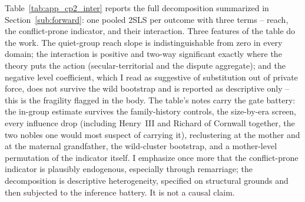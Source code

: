 \documentclass[12pt]{article}
\theoremstyle{definition}
\theoremstyle{remark}
\begin{document}
Table~\ref{tab:app_cp2_inter} reports the full decomposition summarized in Section~\ref{sub:forward}: one pooled 2SLS per outcome with three terms -- reach, the conflict-prone indicator, and their interaction. Three features of the table do the work. The quiet-group reach slope is indistinguishable from zero in every domain; the interaction is positive and two-way significant exactly where the theory puts the action (secular-territorial and the dispute aggregate); and the negative level coefficient, which I read as suggestive of substitution out of private force, does not survive the wild bootstrap and is reported as descriptive only -- this is the fragility flagged in the body. The table's notes carry the gate battery: the in-group estimate survives the family-history controls, the size-by-era screen, every influence drop (including Henry~III and Richard of Cornwall together, the two nobles one would most suspect of carrying it), reclustering at the mother and at the maternal grandfather, the wild-cluster bootstrap, and a mother-level permutation of the indicator itself. I emphasize once more that the conflict-prone indicator is plausibly endogenous, especially through remarriage; the decomposition is descriptive heterogeneity, specified on structural grounds and then subjected to the inference battery. It is not a causal claim.
\end{document}
